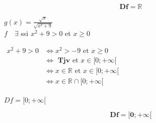 \documentclass[a4paper,12pt]{article}
\begin{document}
    \begin{tcolorbox}[colback=green!20, colframe=green!80, sharp corners]
        \[
        \mathbf{Df=\mathbb{R}}
        \]
    \end{tcolorbox}
    
$g(x) = \frac{\sqrt{x}}{\sqrt{x^{2}+9}}$\\[0.2cm]
$f \quad \exists $ ssi  $ x^{2}+9 > 0 $ et $x \geq 0$

$\begin{aligned}
    x^{2}+9 > 0 &\iff x^{2} > -9 \text{ et } x\geq 0\\
                &\iff \textbf{ Tjv} \text{ et } x\in [0; +\infty[ \\
                &\iff x \in \mathbb{R} \text{ et } x\in [0; +\infty[ \\
                &\iff x \in \mathbb{R} \cap [0; +\infty[ \\
\end{aligned}$

$ Df=[0; +\infty[ $

    \begin{tcolorbox}[colback=green!20, colframe=green!80, sharp corners]
        \[
        \mathbf{Df=[0; +\infty[}
        \]
    \end{tcolorbox}
\end{document}
